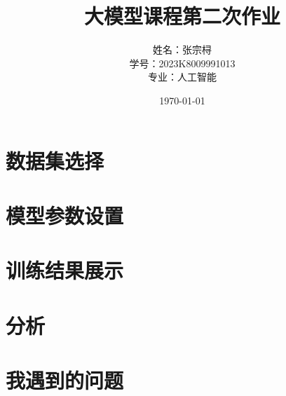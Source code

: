 \documentclass[a4paper,12pt]{ctexart} %
\title{\textbf{大模型课程第二次作业}}
\author{姓名：张宗桪 \\ 学号：2023K8009991013 \\ 专业：人工智能}
\date{\today}
\begin{document}
\pagestyle{plain} %

\maketitle
\thispagestyle{empty} %
\newpage

\tableofcontents
\newpage
\section{数据集选择}

\section{模型参数设置}

\section{训练结果展示}

\section{分析}

\section{我遇到的问题}
\end{document}
